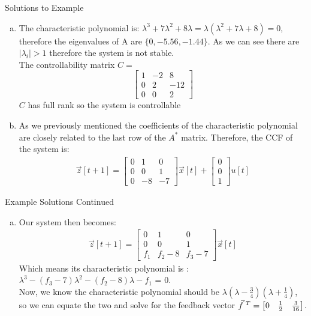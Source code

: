 \documentclass{beamer}
\begin{document}
\begin{frame}{Solutions to Example}
\begin{enumerate}[(a)]
\item The characteristic polynomial is: $\lambda^3 + 7\lambda^2 + 8\lambda = \lambda(\lambda^2 +7\lambda +8) = 0$, therefore the eigenvalues of A are $\{0,-5.56, -1.44\}$. As we can see there are $|\lambda_i|>1$ therefore the system is not stable. \\
The controllability matrix $C =$ \[\begin{bmatrix}
1&-2&8\\
0&2&-12\\ 
0&0&2
\end{bmatrix}\]
$C$ has full rank so the system is controllable

\item As we previously mentioned the coefficients of the characteristic polynomial are closely related to the last row of the $A^*$ matrix. Therefore, the CCF of the system is: 
\begin{align*}
\vec{z}[t+1] = 
\begin{bmatrix} 
0&1&0\\
0&0&1\\ 
0&-8&-7
\end{bmatrix}\vec{x}[t] + \begin{bmatrix} 0 \\ 0 \\1 \end{bmatrix}u[t] 
\end{align*}
\end{enumerate}
\end{frame}

\begin{frame}{Example Solutions Continued}
\begin{enumerate}[(c)]
\item Our system then becomes: 
\begin{align*}
\vec{z}[t+1] = 
\begin{bmatrix} 
0&1&0\\
0&0&1\\ 
f_1&f_2-8&f_3-7
\end{bmatrix}\vec{x}[t] 
\end{align*}
Which means its characteristic polynomial is : $\lambda^3 - (f_3 -7)\lambda^2 -(f_2 - 8)\lambda - f_1$ = 0. \\
Now, we know the characteristic polynomial should be $\lambda(\lambda - \frac{3}{4})(\lambda + \frac{1}{4})$, so we can equate the two and solve for the feedback vector $\vec{f}\hspace{0.1cm}^T = \begin{bmatrix}  0 & \frac{1}{2}& \frac{3}{16}\end{bmatrix}$.
\end{enumerate}
\end{frame}
\end{document}
